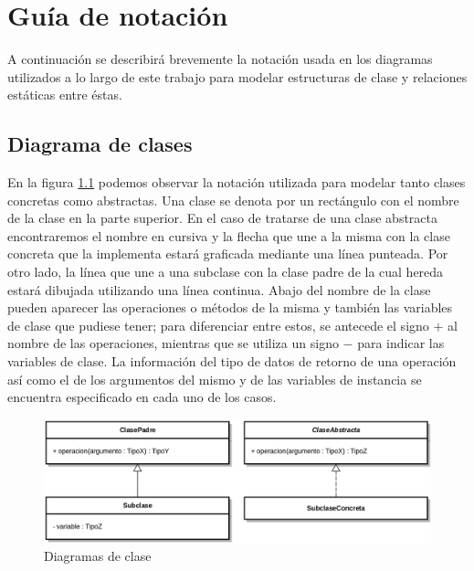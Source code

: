 \chapter{Guía de notación}
\label{ape:notacion}

A continuación se describirá brevemente la notación usada en los diagramas utilizados a lo largo de este trabajo para modelar estructuras de clase y relaciones estáticas entre éstas.

\section{Diagrama de clases}

En la figura \ref{fig:png_diag_clases} podemos observar la notación utilizada para modelar tanto clases concretas como abstractas. Una clase se denota por un rectángulo con el nombre de la clase en la parte superior. En el caso de tratarse de una clase abstracta encontraremos el nombre en cursiva y la flecha que une a la misma con la clase concreta que la implementa estará graficada mediante una línea punteada. Por otro lado, la línea que une a una subclase con la clase padre de la cual hereda estará dibujada utilizando una línea continua. Abajo del nombre de la clase pueden aparecer las operaciones o métodos de la misma y también las variables de clase que pudiese tener; para diferenciar entre estos, se antecede el signo $+$ al nombre de las operaciones, mientras que se utiliza un signo $-$ para indicar las variables de clase. La información del tipo de datos de retorno de una operación así como el de los argumentos del mismo y de las variables de instancia se encuentra especificado en cada uno de los casos. 

\begin{figure}[H]
  	\centering
	\includegraphics[scale=0.17]{img/ref_clases.png}
	\caption{Diagramas de clase}
  	\label{fig:png_diag_clases}
\end{figure}

